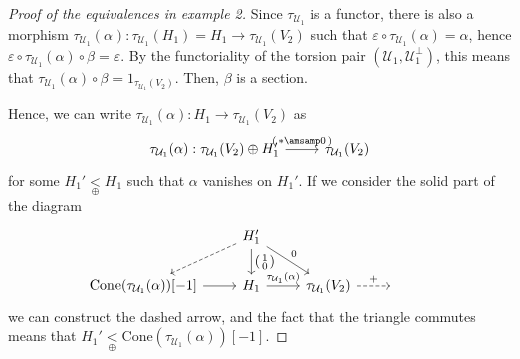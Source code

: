 \begin{proof}[Proof of the equivalences in example 2]
  Since $\tau_{\mathcal{U}_1}$ is a functor, there is also a morphism
  $\tau_{\mathcal{U}_1}(\alpha):\tau_{\mathcal{U}_1}(H_1)=H_1\to \tau_{\mathcal{U}_1}(V_2)$ such that
  $\varepsilon\circ\tau_{\mathcal{U}_1}(\alpha)=\alpha$, hence
  $\varepsilon\circ\tau_{\mathcal{U}_1}(\alpha)\circ\beta = \varepsilon$. By the functoriality of
  the torsion pair $(\mathcal{U}_1,\mathcal{U}_1^\perp)$, this means that
  $\tau_{\mathcal{U}_1}(\alpha)\circ\beta=1_{\tau_{\mathcal{U}_1}(V_2)}$. Then, $\mathcal{\beta}$ is a section.

  Hence, we can write $\tau_{\mathcal{U}_1}(\alpha):H_1\to \tau_{\mathcal{U}_1}(V_2)$
  as
  \begin{equation*}
    \begin{tikzcd}
      \tau_{\mathcal{U}_1}(\alpha):\tau_{\mathcal{U}_1}(V_2)\oplus H_1'
      \arrow{r}{
          \begin{psmallmatrix}
            \ast \amsamp 0
          \end{psmallmatrix}
          }
        & \tau_{\mathcal{U}_1}(V_2)
    \end{tikzcd}
  \end{equation*}
  for some $H_1'\underset{\oplus}{<} H_1$ such that
  $\alpha$ vanishes on $H_1'$. If we consider the solid part of the diagram
  \begin{equation*}
    \begin{tikzcd}
      & H_1'\arrow[dashed]{dl}
      \arrow{d}{
        \begin{psmallmatrix}
          1 \\ 0
        \end{psmallmatrix}
      }\arrow{dr}{0}
        & & &\\
      \mathrm{Cone}(\tau_{\mathcal{U}_1}(\alpha))[-1]\arrow{r}
        & H_1\arrow{r}{\tau_{\mathcal{U}_1}(\alpha)}
          & \tau_{\mathcal{U}_1}(V_2)\arrow[dashed]{r}{+}
            & {}
    \end{tikzcd}
  \end{equation*}
  we can construct the dashed arrow, and the fact that the triangle commutes means
  that $H_1'\underset{\oplus}{<}\mathrm{Cone}(\tau_{\mathcal{U}_1}(\alpha))[-1]$.


\end{proof}
